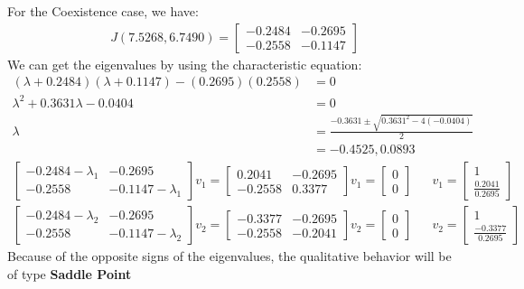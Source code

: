 \documentclass[12pt]{article}
\begin{document}
For the Coexistence case, we have:
	\begin{align*}
J(7.5268, 6.7490) = 
\begin{bmatrix}
-0.2484  & -0.2695 \\
-0.2558  & -0.1147
\end{bmatrix}
\end{align*}
We can get the eigenvalues by using the characteristic equation:
	\begin{align*}
		(\lambda + 0.2484)(\lambda + 0.1147) - (0.2695)(0.2558) &= 0 \\
		\lambda^2 + 0.3631\lambda - 0.0404 &= 0 \\
		\lambda &= \frac{-0.3631 \pm \sqrt{0.3631^2 - 4(- 0.0404)}}{2} \\
		&= -0.4525, 0.0893
	\end{align*}
\begin{align*}
\begin{bmatrix}
-0.2484 - \lambda_1  & -0.2695 \\
-0.2558  & -0.1147 - \lambda_1
\end{bmatrix}v_1 = 
\begin{bmatrix}
 0.2041 &  -0.2695 \\
-0.2558  &  0.3377
\end{bmatrix}v_1 = 
\begin{bmatrix}
0 \\ 0
\end{bmatrix} && 
v_1 = 
\begin{bmatrix}
1 \\ \frac{0.2041}{0.2695}
\end{bmatrix} \\
\begin{bmatrix}
-0.2484 - \lambda_2  & -0.2695 \\
-0.2558  & -0.1147 - \lambda_2
\end{bmatrix}v_2 = 
\begin{bmatrix}
-0.3377 &  -0.2695 \\
-0.2558 &  -0.2041
\end{bmatrix}v_2 = 
\begin{bmatrix}
0 \\ 0
\end{bmatrix} && 
v_2 = 
\begin{bmatrix}
1 \\ \frac{-0.3377}{0.2695}
\end{bmatrix}
\end{align*}	
Because of the opposite signs of the eigenvalues, the qualitative behavior will be of type \textbf{Saddle Point}	
	
	
\end{document}
